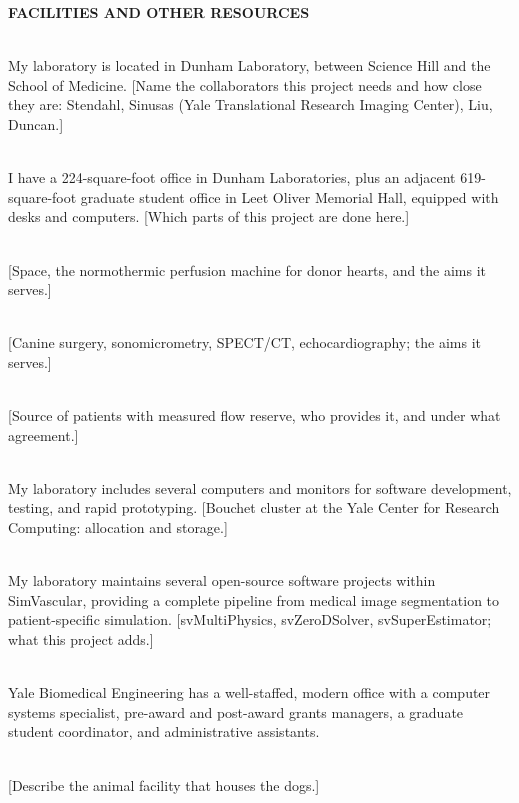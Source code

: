 \documentclass[11pt]{article}
\begin{document}
\textbf{FACILITIES AND OTHER RESOURCES}

\\
My laboratory is located in Dunham Laboratory, between Science Hill and the School of Medicine. [Name the collaborators this project needs and how close they are: Stendahl, Sinusas (Yale Translational Research Imaging Center), Liu, Duncan.]

\\
I have a 224-square-foot office in Dunham Laboratories, plus an adjacent 619-square-foot graduate student office in Leet Oliver Memorial Hall, equipped with desks and computers. [Which parts of this project are done here.]

\\
{}[Space, the normothermic perfusion machine for donor hearts, and the aims it serves.]

\\
{}[Canine surgery, sonomicrometry, SPECT/CT, echocardiography; the aims it serves.]

\\
{}[Source of patients with measured flow reserve, who provides it, and under what agreement.]

\\
My laboratory includes several computers and monitors for software development, testing, and rapid prototyping. [Bouchet cluster at the Yale Center for Research Computing: allocation and storage.]

\\
My laboratory maintains several open-source software projects within SimVascular, providing a complete pipeline from medical image segmentation to patient-specific simulation. [svMultiPhysics, svZeroDSolver, svSuperEstimator; what this project adds.]

\\
Yale Biomedical Engineering has a well-staffed, modern office with a computer systems specialist, pre-award and post-award grants managers, a graduate student coordinator, and administrative assistants.

\\
{}[Describe the animal facility that houses the dogs.]
\end{document}
